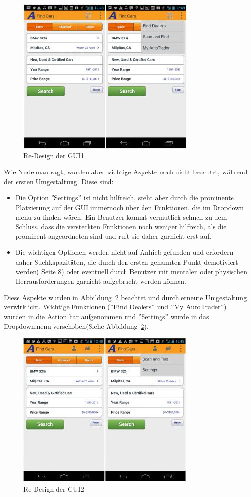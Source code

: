 \begin{figure}[h]
 \centering
 \includegraphics[height=0.40\textheight]{img/Design3.png}
 \caption{Re-Design der GUI1}
 \label{fig:design3}
\end{figure}

Wie Nudelman sagt, wurden aber wichtige Aspekte noch nicht beachtet, während der ersten Umgestaltung. Diese sind:
\begin{itemize}
\item Die Option ''Settings'' ist nicht hilfreich, steht aber durch die prominente Platzierung auf der GUI immernoch über den Funktionen, die im Dropdown menu zu finden wären. Ein Benutzer kommt vermutlich schnell zu dem Schluss, dass die versteckten Funktionen noch weniger hilfreich, als die prominent angeordneten sind und ruft sie daher garnicht erst auf.
\item Die wichtigen Optionen werden nicht auf Anhieb gefunden und erfordern daher Suchkapazitäten, die durch den ersten genannten Punkt demotiviert werden(\cite{AndroidDesignPatterns} Seite 8) oder eventuell durch Benutzer mit mentalen oder physischen Herrausforderungen garnicht aufgebracht werden können.
\end{itemize}

Diese Aspekte wurden in Abbildung~\ref{fig:design4} beachtet und durch erneute Umgestaltung verwirklicht. Wichtige Funktionen (''Find Dealers'' und ''My AutoTrader'') wurden in die Action bar aufgenommen und ''Settings'' wurde in das Dropdownmenu verschoben(Siehe Abbildung~\ref{fig:design4}).

\begin{figure}[h]
 \centering
 \includegraphics[height=0.40\textheight]{img/Design4.png}
 \caption{Re-Design der GUI2}
 \label{fig:design4}
\end{figure}

